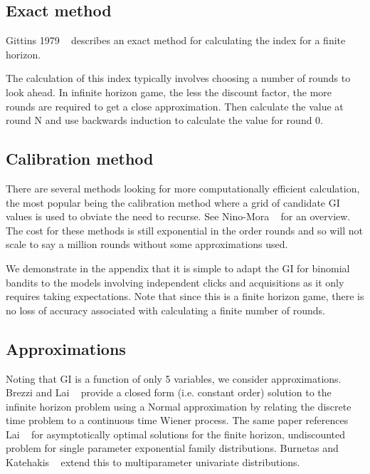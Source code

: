 \documentclass[11pt,a4,singlespacing,titlepagenumber=on]{scrreprt}
\numberwithin{equation}{chapter} %
\theoremstyle{remark}
\begin{document}
\subsection{ Exact method }

Gittins 1979 ~\cite{gittins1979bandit} describes an exact method for calculating the index for a finite horizon. 

The calculation of this index typically involves choosing a number of rounds to look ahead. In infinite horizon game, the less the discount factor, the more rounds are required to get a close approximation. Then calculate the value at round N and use backwards induction to calculate the value for round 0.

\subsection{ Calibration method }

There are several methods looking for more computationally efficient calculation, the most popular being the calibration method where a grid of candidate GI values is used to obviate the need to recurse. See Nino-Mora ~\cite{nino2011computing} for an overview. The cost for these methods is still exponential in the order rounds and so will not scale to say a million rounds without some approximations used.

We demonstrate in the appendix that it is simple to adapt the GI for binomial bandits to the models involving independent clicks and acquisitions as it only requires taking expectations. Note that since this is a finite horizon game, there is no loss of accuracy associated with calculating a finite number of rounds.

\subsection{ Approximations }

Noting that GI is a function of only 5 variables, we consider approximations. Brezzi and Lai ~\cite{brezzi2002optimal} provide a closed form (i.e. constant order) solution to the infinite horizon problem using a Normal approximation by relating the discrete time problem to a continuous time Wiener process.  The same paper references Lai ~\cite{lai1987adaptive} for asymptotically optimal solutions for the finite horizon, undiscounted problem for single parameter exponential family distributions. Burnetas and Katehakis ~\cite{burnetas1996optimal} extend this to multiparameter univariate distributions.
\end{document}
